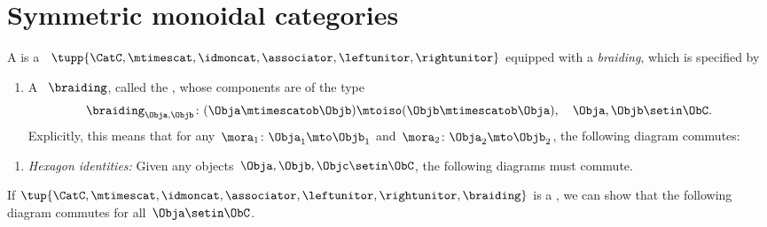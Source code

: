 
\section{Symmetric monoidal categories}


\begin{ctdefinition}
    \label{def:braided-monoidal-category}
    A  is a ~$\tupp{\CatC, \mtimescat, \idmoncat, \associator, \leftunitor, \rightunitor}$ eq\-uip\-ped with a \emph{braiding}, which is specified by

    \constit
    \begin{enumerate}
        \item A ~$\braiding$, called the , whose components are of the type \label{def:braiding}
              \begin{equation}
                  \label{eq:braiding_symmetry}
                  \braiding_{\Obja,\Objb}\colon (\Obja\mtimescatob \Objb)\mtoiso (\Objb\mtimescatob \Obja), \quad \Obja,\Objb \setin \ObC.
              \end{equation}
              Explicitly, this means that for any~$\mora_1\colon \Obja_1\mto \Objb_1$ and~$\mora_2\colon \Obja_2\mto \Objb_2$, the following diagram commutes:
    \end{enumerate}

    \condit
    \begin{enumerate}
        \item \emph{Hexagon identities:} Given any objects~$\Obja,\Objb,\Objc\setin \ObC$, the following diagrams must commute.
    \end{enumerate}
\end{ctdefinition}

\begin{remark}
    If $\tup{\CatC,\mtimescat, \idmoncat, \associator, \leftunitor, \rightunitor, \braiding}$ is a , we can show that the following diagram commutes for all~$\Obja \setin \ObC$.
\end{remark}


